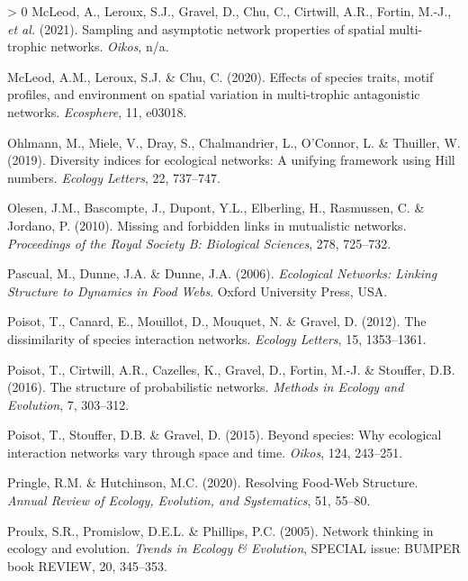 \documentclass[11pt]{article}
\newlength{\cslhangindent}
\newenvironment{CSLReferences}[3] %
 {%
  \setlength{\parindent}{0pt}
  \ifodd #1 \everypar{\setlength{\hangindent}{\cslhangindent}}\ignorespaces\fi
  \ifnum #2 > 0
  \setlength{\parskip}{#2\baselineskip}
  \fi
 }%
 {}
\begin{document}
\begin{CSLReferences}{1}{0}
\leavevmode\hypertarget{ref-McLeod2021Sampling}{}%
McLeod, A., Leroux, S.J., Gravel, D., Chu, C., Cirtwill, A.R., Fortin,
M.-J., \emph{et al.} (2021). Sampling and asymptotic network properties
of spatial multi-trophic networks. \emph{Oikos}, n/a.

\leavevmode\hypertarget{ref-McLeod2020EffSpe}{}%
McLeod, A.M., Leroux, S.J. \& Chu, C. (2020). Effects of species traits,
motif profiles, and environment on spatial variation in multi-trophic
antagonistic networks. \emph{Ecosphere}, 11, e03018.

\leavevmode\hypertarget{ref-Ohlmann2019Diversity}{}%
Ohlmann, M., Miele, V., Dray, S., Chalmandrier, L., O'Connor, L. \&
Thuiller, W. (2019). Diversity indices for ecological networks: A
unifying framework using Hill numbers. \emph{Ecology Letters}, 22,
737--747.

\leavevmode\hypertarget{ref-Olesen2010Missing}{}%
Olesen, J.M., Bascompte, J., Dupont, Y.L., Elberling, H., Rasmussen, C.
\& Jordano, P. (2010). Missing and forbidden links in mutualistic
networks. \emph{Proceedings of the Royal Society B: Biological
Sciences}, 278, 725--732.

\leavevmode\hypertarget{ref-Pascual2006Ecologicala}{}%
Pascual, M., Dunne, J.A. \& Dunne, J.A. (2006). \emph{Ecological
Networks: Linking Structure to Dynamics in Food Webs}. Oxford University
Press, USA.

\leavevmode\hypertarget{ref-Poisot2012Dissimilaritya}{}%
Poisot, T., Canard, E., Mouillot, D., Mouquet, N. \& Gravel, D. (2012).
The dissimilarity of species interaction networks. \emph{Ecology
Letters}, 15, 1353--1361.

\leavevmode\hypertarget{ref-Poisot2016Structure}{}%
Poisot, T., Cirtwill, A.R., Cazelles, K., Gravel, D., Fortin, M.-J. \&
Stouffer, D.B. (2016). The structure of probabilistic networks.
\emph{Methods in Ecology and Evolution}, 7, 303--312.

\leavevmode\hypertarget{ref-Poisot2015Speciesa}{}%
Poisot, T., Stouffer, D.B. \& Gravel, D. (2015). Beyond species: Why
ecological interaction networks vary through space and time.
\emph{Oikos}, 124, 243--251.

\leavevmode\hypertarget{ref-Pringle2020Resolving}{}%
Pringle, R.M. \& Hutchinson, M.C. (2020). Resolving Food-Web Structure.
\emph{Annual Review of Ecology, Evolution, and Systematics}, 51, 55--80.

\leavevmode\hypertarget{ref-Proulx2005Networka}{}%
Proulx, S.R., Promislow, D.E.L. \& Phillips, P.C. (2005). Network
thinking in ecology and evolution. \emph{Trends in Ecology \&
Evolution}, SPECIAL issue: BUMPER book REVIEW, 20, 345--353.


\end{CSLReferences}
\end{document}
